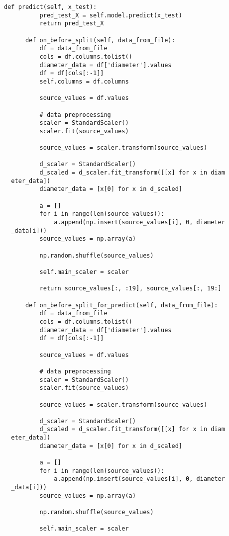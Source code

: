 \begin{lstlisting}[caption={Код программы для тестирования приложения с подключенной моделью регрессии экспериментальных данных}, label={ls:a:02}]
      def predict(self, x_test):
          pred_test_X = self.model.predict(x_test)
          return pred_test_X
  
      def on_before_split(self, data_from_file):
          df = data_from_file
          cols = df.columns.tolist()
          diameter_data = df['diameter'].values
          df = df[cols[:-1]]
          self.columns = df.columns
  
          source_values = df.values
  
          # data preprocessing
          scaler = StandardScaler()
          scaler.fit(source_values)
  
          source_values = scaler.transform(source_values)
  
          d_scaler = StandardScaler()
          d_scaled = d_scaler.fit_transform([[x] for x in diam
  eter_data])
          diameter_data = [x[0] for x in d_scaled]
  
          a = []
          for i in range(len(source_values)):
              a.append(np.insert(source_values[i], 0, diameter
  _data[i]))
          source_values = np.array(a)
  
          np.random.shuffle(source_values)
  
          self.main_scaler = scaler
  
          return source_values[:, :19], source_values[:, 19:]
  
      def on_before_split_for_predict(self, data_from_file):
          df = data_from_file
          cols = df.columns.tolist()
          diameter_data = df['diameter'].values
          df = df[cols[:-1]]
  
          source_values = df.values
  
          # data preprocessing
          scaler = StandardScaler()
          scaler.fit(source_values)
  
          source_values = scaler.transform(source_values)
  
          d_scaler = StandardScaler()
          d_scaled = d_scaler.fit_transform([[x] for x in diam
  eter_data])
          diameter_data = [x[0] for x in d_scaled]
  
          a = []
          for i in range(len(source_values)):
              a.append(np.insert(source_values[i], 0, diameter
  _data[i]))
          source_values = np.array(a)
  
          np.random.shuffle(source_values)
  
          self.main_scaler = scaler
  

\end{lstlisting}
